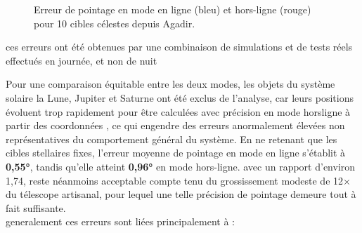 \documentclass[12pt,a4paper]{report}
\begin{document}
\begin{enumerate}
\begin{figure}[H]
    \caption{Erreur de pointage en mode en ligne (bleu) et hors-ligne (rouge) pour 10 cibles célestes depuis Agadir.}
    \label{fig:precision_telescope}
\end{figure}
\begin{remarque}
     ces erreurs ont été obtenues par une combinaison de simulations et de tests réels effectués en journée, et non de nuit
\end{remarque}

Pour une comparaison équitable entre les deux modes, les objets du système solaire  la Lune, Jupiter et Saturne  ont été exclus de l'analyse, car leurs positions évoluent trop rapidement pour être calculées avec précision en mode horsligne à partir des coordonnées , ce qui engendre des erreurs anormalement élevées non représentatives du comportement général du système. En ne retenant que les cibles stellaires fixes, l'erreur moyenne de pointage en mode en ligne s'établit à \textbf{0,55°}, tandis qu'elle atteint \textbf{0,96°} en mode hors-ligne. avec un rapport d'environ 1,74, reste néanmoins acceptable compte tenu du grossissement modeste de 12× du télescope artisanal, pour lequel une telle précision de pointage demeure tout à fait suffisante.\\

generalement ces erreurs sont liées principalement à :\\


\end{enumerate}
\end{document}
